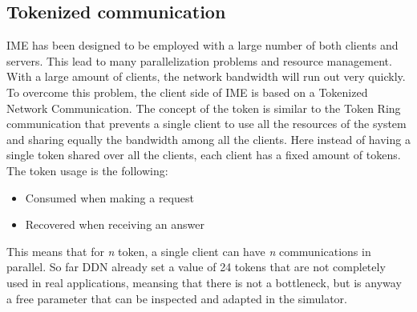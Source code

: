 \subsection{Tokenized communication}
IME has been designed to be employed with a large number of both clients and
servers. This lead to many parallelization problems and resource management.
With a large amount of clients, the network bandwidth will run out very quickly.
To overcome this problem, the client side of IME is based on a Tokenized Network
Communication. The concept of the token is similar to the Token Ring
communication \cite{token-ring} that prevents a single client to use all the
resources of the system and sharing equally the bandwidth among all the
clients.  Here instead of having a single token shared over all the clients,
each client has a fixed amount of tokens.\\
The token usage is the following:
\begin{itemize}
    \item Consumed when making a request
    \item Recovered when receiving an answer
\end{itemize}
This means that for \textit{n} token, a single client can have \textit{n}
communications in parallel.  So far DDN already set a value of 24 tokens that
are not completely used in real applications, meansing that there is not a
bottleneck, but is anyway a free parameter that can be inspected and adapted in
the simulator.



